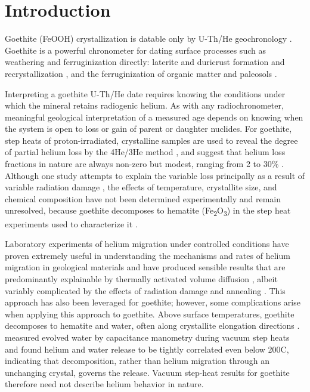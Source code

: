 \section{Introduction}\label{introduction}

Goethite (FeOOH) crystallization is datable only by U-Th/He
geochronology \citep{shustervasconcelos2005,farley2024}. Goethite is a
powerful chronometer for dating surface processes such as weathering and
ferruginization directly: laterite and duricrust formation and
recrystallization \citep{monteiro2014,allard2018,ansart2022}, and the
ferruginization of organic matter and paleosols \citep{heim2006,yappshuster2011,vasconcelos2013,danisik2013,hofmann2017}.

Interpreting a goethite U-Th/He date requires knowing the conditions
under which the mineral retains radiogenic helium. As with any
radiochronometer, meaningful geological interpretation of a measured age
depends on knowing when the system is open to loss or gain of parent or
daughter nuclides. For goethite, step heats of proton-irradiated,
crystalline samples are used to reveal the degree of partial helium loss
by the 4He/3He method \citep{shustervasconcelos2005}, and suggest that
helium loss fractions in nature are always non-zero but modest, ranging
from 2 to 30\% \citep{shustervasconcelos2005,heim2006,hofmann2017,deng2017}.
Although one study attempts to explain the variable loss principally as a
result of variable radiation damage \citep{bassal2022}, the effects of
temperature, crystallite size, and chemical composition have not been
determined experimentally and remain unresolved, because goethite
decomposes to hematite (Fe\textsubscript{2}O\textsubscript{3}) in the step
heat experiments used to characterize it \citep{farley2024}.

Laboratory experiments of helium migration under controlled conditions
have proven extremely useful in understanding the mechanisms and rates
of helium migration in geological materials and have produced sensible
results that are predominantly explainable by thermally activated volume
diffusion \citep{reinersfarley1999,farley2000,farley2007,cherniakwatson2011,farley2018}, albeit variably complicated by
the effects of radiation damage and annealing \citep{shuster2006,guenthner2013}. This approach has also been leveraged for
goethite; however, some complications arise when applying this approach
to goethite. Above surface temperatures, goethite decomposes to hematite
and water, often along crystallite elongation directions \citep{goss1987}.
\citet{farley2024} measured evolved water by capacitance manometry during
vacuum step heats and found helium and water release to be tightly
correlated even below 200\textdegree C, indicating that decomposition,
rather than helium migration through an unchanging crystal, governs the
release. Vacuum step-heat results for goethite therefore need not describe
helium behavior in nature.

